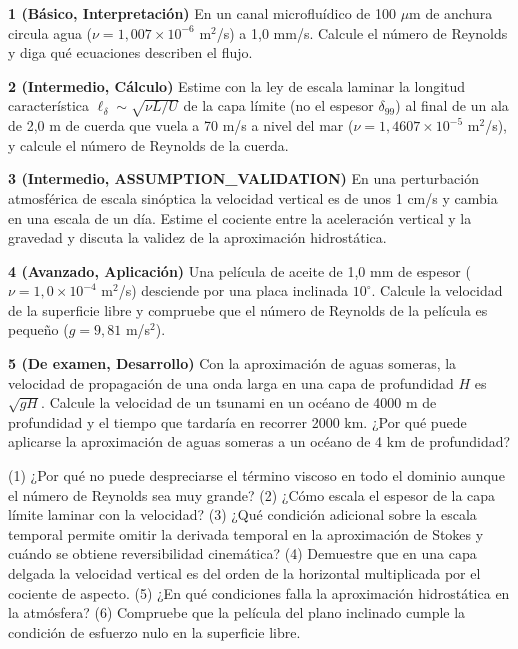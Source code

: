 \documentclass[10pt,openany]{book}
\begin{document}
\begin{tcolorbox}[title={Ejercicios propuestos}, studiumworked, breakable]

\noindent\textbf{1 (Básico, Interpretación)}
En un canal microfluídico de 100 \(\mu\)m de anchura circula agua (\(\nu = 1{,}007\times 10^{-6}\) m\(^2\)/s) a 1,0 mm/s. Calcule el número de Reynolds y diga qué ecuaciones describen el flujo.

\noindent\textbf{2 (Intermedio, Cálculo)}
Estime con la ley de escala laminar la longitud característica \(\ell_\delta\sim\sqrt{\nu L/U}\) de la capa límite (no el espesor \(\delta_{99}\)) al final de un ala de 2,0 m de cuerda que vuela a 70 m/s a nivel del mar (\(\nu = 1{,}4607\times 10^{-5}\) m\(^2\)/s), y calcule el número de Reynolds de la cuerda.

\noindent\textbf{3 (Intermedio, ASSUMPTION\_VALIDATION)}
En una perturbación atmosférica de escala sinóptica la velocidad vertical es de unos 1 cm/s y cambia en una escala de un día. Estime el cociente entre la aceleración vertical y la gravedad y discuta la validez de la aproximación hidrostática.

\noindent\textbf{4 (Avanzado, Aplicación)}
Una película de aceite de 1,0 mm de espesor (\(\nu = 1{,}0\times 10^{-4}\) m\(^2\)/s) desciende por una placa inclinada \(10^\circ\). Calcule la velocidad de la superficie libre y compruebe que el número de Reynolds de la película es pequeño (\(g = 9{,}81\) m/s\(^2\)).

\noindent\textbf{5 (De examen, Desarrollo)}
Con la aproximación de aguas someras, la velocidad de propagación de una onda larga en una capa de profundidad \(H\) es \(\sqrt{gH}\). Calcule la velocidad de un tsunami en un océano de 4000 m de profundidad y el tiempo que tardaría en recorrer 2000 km. ¿Por qué puede aplicarse la aproximación de aguas someras a un océano de 4 km de profundidad?
\end{tcolorbox}

\begin{tcolorbox}[title={Autoevaluación}, studiumcheck, breakable]

(1) ¿Por qué no puede despreciarse el término viscoso en todo el dominio aunque el número de Reynolds sea muy grande? (2) ¿Cómo escala el espesor de la capa límite laminar con la velocidad? (3) ¿Qué condición adicional sobre la escala temporal permite omitir la derivada temporal en la aproximación de Stokes y cuándo se obtiene reversibilidad cinemática? (4) Demuestre que en una capa delgada la velocidad vertical es del orden de la horizontal multiplicada por el cociente de aspecto. (5) ¿En qué condiciones falla la aproximación hidrostática en la atmósfera? (6) Compruebe que la película del plano inclinado cumple la condición de esfuerzo nulo en la superficie libre.
\end{tcolorbox}
\studiumchaptercheck
\end{document}

